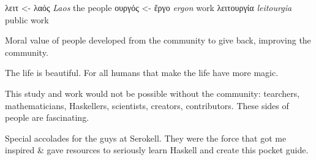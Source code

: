 \documentclass[a4paper,14pt,oneside]{book}
\begin{document}
\textgreek{λειτ}       <- \textgreek{λαός}  \emph{Laos}       the people
    \textgreek{ουργός} <- \textgreek{ἔργο}  \emph{ergon}             work
\textgreek{λειτουργία}          \emph{leitourgia} public work

Moral value of people developed from the community to give back, improving the community.

The life is beautiful.
For all humans that make the life have more magic.

This study and work would not be possible without the community: tearchers, mathematicians, Haskellers, scientists, creators, contributors. These sides of people are fascinating.


Special accolades for the guys at Serokell. They were the force that got me inspired \& gave resources to seriously learn Haskell and create this pocket guide.
\end{document}
